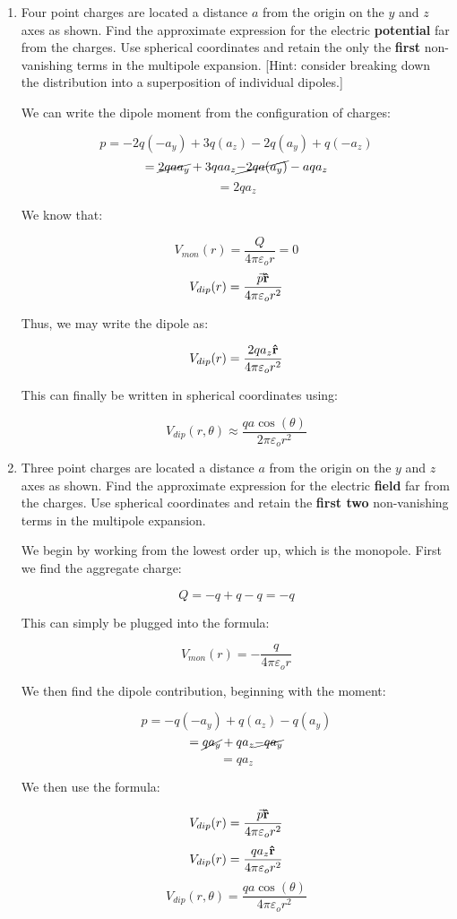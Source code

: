 \begin{enumerate}

  \item Four point charges are located a distance $a$ from the origin on the $y$ and $z$ axes as shown.  Find the approximate expression for the electric \textbf{potential} far from the charges.  Use spherical coordinates and retain the only the \textbf{first} non-vanishing terms in the multipole expansion. [Hint: consider breaking down the distribution into a superposition of individual dipoles.]

    We can write the dipole moment from the configuration of charges:

    $$p=-2q(-a_y)+3q(a_z)-2q(a_y)+q(-a_z)$$
    $$=\cancel{2qaa_y}+3qaa_z\cancel{-2qa(a_y)}-aqa_z$$
    $$=2qa_z$$

    We know that:

    $$V_{mon}(r)=\frac{Q}{4\pi\varepsilon_o r}=0$$
    $$V_{dip}(r)=\frac{\vec{p}\bold{\hat{r}}}{4\pi\varepsilon_o r^2}$$

    Thus, we may write the dipole as:

    $$V_{dip}(r)=\frac{2qa_z\bold{\hat{r}}}{4\pi\varepsilon_o r^2}$$

    This can finally be written in spherical coordinates using:

    $$\boxed{V_{dip}(r,\theta)\approx\frac{qa\cos(\theta)}{2\pi\varepsilon_o r^2}}$$

  \item Three point charges are located a distance $a$ from the origin on the $y$ and $z$ axes as shown.  Find the approximate expression for the electric \textbf{field} far from the charges.  Use spherical coordinates and retain the \textbf{first two} non-vanishing terms in the multipole expansion.

    We begin by working from the lowest order up, which is the monopole. First we find the aggregate charge:

    $$Q=-q+q-q=-q$$

    This can simply be plugged into the formula:

    $$V_{mon}(r)=-\frac{q}{4\pi\varepsilon_o r}$$

    We then find the dipole contribution, beginning with the moment:

    $$p=-q(-a_y)+q(a_z)-q(a_y)$$
    $$=\cancel{qa_y}+qa_z\cancel{-qa_y}$$
    $$=qa_z$$

    We then use the formula:

    $$V_{dip}(r)=\frac{\vec{p}\bold{\hat{r}}}{4\pi\varepsilon_o r^2}$$
    $$V_{dip}(r)=\frac{qa_z\bold{\hat{r}}}{4\pi\varepsilon_o r^2}$$
    $$V_{dip}(r,\theta)=\frac{qa\cos(\theta)}{4\pi\varepsilon_o r^2}$$


\end{enumerate}
